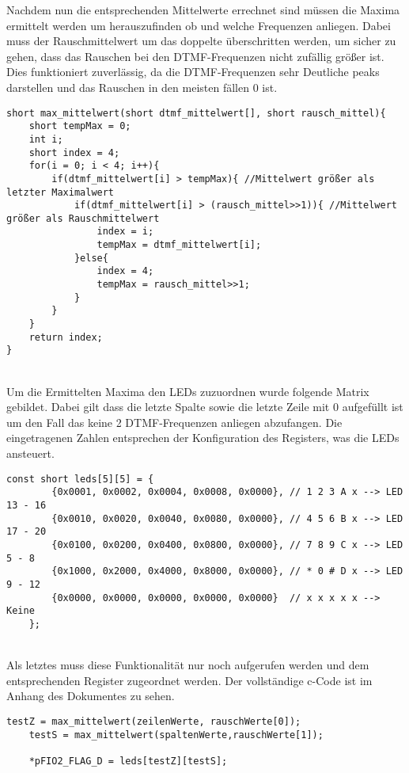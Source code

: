 Nachdem nun die entsprechenden Mittelwerte errechnet sind müssen die Maxima ermittelt werden um herauszufinden ob und welche Frequenzen anliegen. Dabei muss der Rauschmittelwert um das doppelte überschritten werden, um sicher zu gehen, dass das Rauschen bei den DTMF-Frequenzen nicht zufällig größer ist. Dies funktioniert zuverlässig, da die DTMF-Frequenzen sehr Deutliche peaks darstellen und das Rauschen in den meisten fällen 0 ist.\\
 \begin{adjustbox}{width=\textwidth, keepaspectratio} 
  \label{code:procdataKompFIR}
  \begin{lstlisting}[title=Bestimmung der Maxima]
short max_mittelwert(short dtmf_mittelwert[], short rausch_mittel){
	short tempMax = 0;
	int i; 
	short index = 4;
	for(i = 0; i < 4; i++){
		if(dtmf_mittelwert[i] > tempMax){ //Mittelwert größer als letzter Maximalwert
			if(dtmf_mittelwert[i] > (rausch_mittel>>1)){ //Mittelwert größer als Rauschmittelwert 
				index = i;
				tempMax = dtmf_mittelwert[i];
			}else{
				index = 4;
				tempMax = rausch_mittel>>1;
			}
		}
	}
	return index;
}
\end{lstlisting}
\end{adjustbox}\\
Um die Ermittelten Maxima den LEDs zuzuordnen wurde folgende Matrix gebildet. Dabei gilt dass die letzte Spalte sowie die letzte Zeile mit 0 aufgefüllt ist um den Fall das keine 2 DTMF-Frequenzen anliegen abzufangen. Die eingetragenen Zahlen entsprechen der Konfiguration des Registers, was die LEDs ansteuert.\\
 \begin{adjustbox}{width=\textwidth, keepaspectratio} 
  \label{code:procdataKompFIR}
  \begin{lstlisting}[title=Zuordnung zu den LEDs]
const short leds[5][5] = {
		{0x0001, 0x0002, 0x0004, 0x0008, 0x0000}, // 1 2 3 A x --> LED 13 - 16
		{0x0010, 0x0020, 0x0040, 0x0080, 0x0000}, // 4 5 6 B x --> LED 17 - 20
		{0x0100, 0x0200, 0x0400, 0x0800, 0x0000}, // 7 8 9 C x --> LED 5 - 8
		{0x1000, 0x2000, 0x4000, 0x8000, 0x0000}, // * 0 # D x --> LED 9 - 12
		{0x0000, 0x0000, 0x0000, 0x0000, 0x0000}  // x x x x x --> Keine
	};
\end{lstlisting}
\end{adjustbox}\\
Als letztes muss diese Funktionalität nur noch aufgerufen werden und dem entsprechenden Register zugeordnet werden. Der vollständige c-Code ist im Anhang des Dokumentes zu sehen.\\
 \begin{adjustbox}{width=\textwidth, keepaspectratio} 
  \label{code:procdataKompFIR}
  \begin{lstlisting}[title=Konfiguration Register]
	testZ = max_mittelwert(zeilenWerte, rauschWerte[0]);
	testS = max_mittelwert(spaltenWerte,rauschWerte[1]);
	
	*pFIO2_FLAG_D = leds[testZ][testS];
	
\end{lstlisting}
\end{adjustbox}\\

